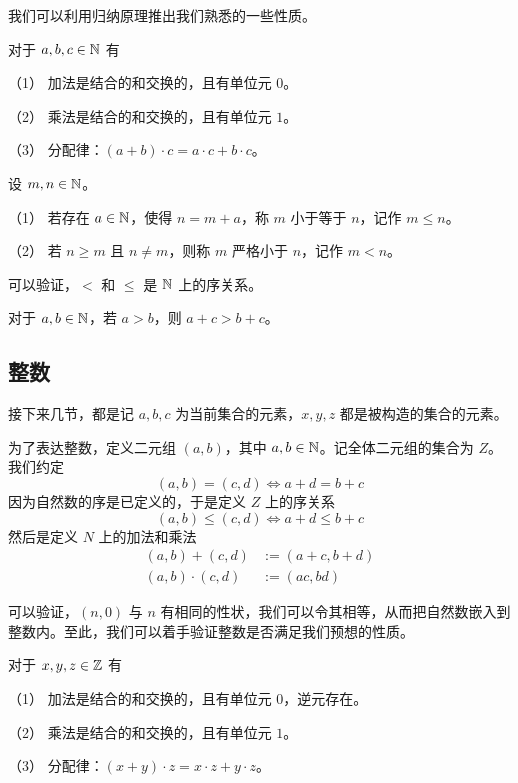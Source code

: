 我们可以利用归纳原理推出我们熟悉的一些性质。

\begin{theorem}[$\NN$ 的代数算律]
	对于 $a,b,c\in \mathbb{N}$ 有

	（1） 加法是结合的和交换的，且有单位元 $0$。

	（2） 乘法是结合的和交换的，且有单位元 $1$。

	（3） 分配律：$(a+b) \cdot  c = a \cdot c + b\cdot c$。
\end{theorem}

\begin{definition}[$\NN$ 的序]
	设 $m,n\in \mathbb{N}$。

	（1） 若存在 $a\in \mathbb{N}$，使得 $n=m+a$，称 $m$ 小于等于 $n$，记作 $m \leqslant n$。

	（2） 若 $n\geqslant m$ 且 $n\ne m$，则称 $m$ 严格小于 $n$，记作 $m < n$。
\end{definition}

可以验证，$<$ 和 $\leqslant$ 是 $\NN$ 上的序关系。

\begin{theorem}[加法保序]
	对于 $a,b\in \mathbb{N}$，若 $a>b$，则 $a+c>b+c$。
\end{theorem}

\subsection{整数}

接下来几节，都是记 $a,b,c$ 为当前集合的元素，$x,y,z$ 都是被构造的集合的元素。

为了表达整数，定义二元组 $(a,b)$，其中 $a,b \in \mathbb{N}$。记全体二元组的集合为 $Z$。我们约定
$$(a,b) = (c,d) \Leftrightarrow a+d=b+c$$
因为自然数的序是已定义的，于是定义 $Z$ 上的序关系
$$(a,b) \leqslant (c,d) \Leftrightarrow a+d \leqslant b+c$$
然后是定义 $N$ 上的加法和乘法
\begin{equation*}
	\begin{aligned}
		(a,b) + (c,d) &:= (a+c,b+d)\\
		(a,b) \cdot (c,d) &:= (a c,b d)
	\end{aligned}
\end{equation*}

可以验证，$(n,0)$ 与 $n$ 有相同的性状，我们可以令其相等，从而把自然数嵌入到整数内。至此，我们可以着手验证整数是否满足我们预想的性质。

\begin{theorem}[$\ZZ$ 的代数算律]
	对于 $x,y,z\in \mathbb{Z}$ 有

	（1） 加法是结合的和交换的，且有单位元 $0$，逆元存在。

	（2） 乘法是结合的和交换的，且有单位元 $1$。

	（3） 分配律：$(x+y) \cdot  z = x \cdot z + y\cdot z$。
\end{theorem}

